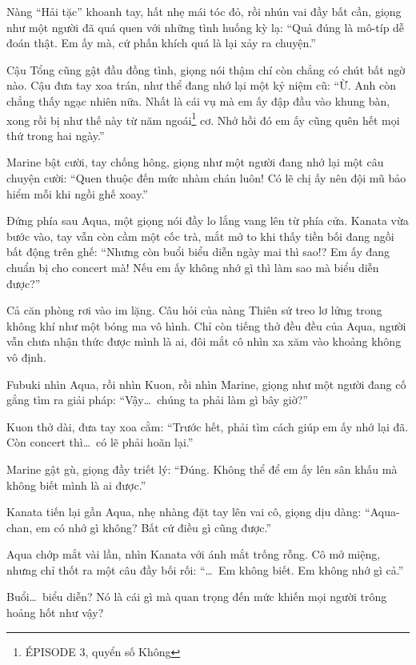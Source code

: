 \documentclass[../main.tex]{subfiles}
\begin{document}
Nàng ``Hải tặc'' khoanh tay, hất nhẹ mái tóc đỏ, rồi nhún vai đầy bất cần, giọng như một người đã quá quen với những tình huống kỳ lạ: ``Quả đúng là mô-típ dễ đoán thật. Em ấy mà, cứ phấn khích quá là lại xảy ra chuyện.''

Cậu Tổng cũng gật đầu đồng tình, giọng nói thậm chí còn chẳng có chút bất ngờ nào. Cậu đưa tay xoa trán, như thể đang nhớ lại một kỷ niệm cũ: ``Ừ. Anh còn chẳng thấy ngạc nhiên nữa. Nhất là cái vụ mà em ấy đập đầu vào khung bàn, xong rồi bị như thế này từ năm ngoái\footnote{{\flaregothic ÉPISODE 3}, quyển số Không} cơ. Nhớ hồi đó em ấy cũng quên hết mọi thứ trong hai ngày.''

Marine bật cười, tay chống hông, giọng như một người đang nhớ lại một câu chuyện cười: ``Quen thuộc đến mức nhàm chán luôn! Có lẽ chị ấy nên đội mũ bảo hiểm mỗi khi ngồi ghế xoay.''

Đứng phía sau Aqua, một giọng nói đầy lo lắng vang lên từ phía cửa. Kanata vừa bước vào, tay vẫn còn cầm một cốc trà, mắt mở to khi thấy tiền bối đang ngồi bất động trên ghế: ``Nhưng còn buổi biểu diễn ngày mai thì sao!? Em ấy đang chuẩn bị cho concert mà! Nếu em ấy không nhớ gì thì làm sao mà biểu diễn được?''


Cả căn phòng rơi vào im lặng. Câu hỏi của nàng Thiên sứ treo lơ lửng trong không khí như một bóng ma vô hình. Chỉ còn tiếng thở đều đều của Aqua, người vẫn chưa nhận thức được mình là ai, đôi mắt cô nhìn xa xăm vào khoảng không vô định.

Fubuki nhìn Aqua, rồi nhìn Kuon, rồi nhìn Marine, giọng như một người đang cố gắng tìm ra giải pháp: ``Vậy\dots\ chúng ta phải làm gì bây giờ?''

Kuon thở dài, đưa tay xoa cằm: ``Trước hết, phải tìm cách giúp em ấy nhớ lại đã. Còn concert thì\dots\ có lẽ phải hoãn lại.''

Marine gật gù, giọng đầy triết lý: ``Đúng. Không thể để em ấy lên sân khấu mà không biết mình là ai được.''

Kanata tiến lại gần Aqua, nhẹ nhàng đặt tay lên vai cô, giọng dịu dàng: ``Aqua-chan, em có nhớ gì không? Bất cứ điều gì cũng được.''

Aqua chớp mắt vài lần, nhìn Kanata với ánh mắt trống rỗng. Cô mở miệng, nhưng chỉ thốt ra một câu đầy bối rối: ``\dots\ Em không biết. Em không nhớ gì cả.''


Buổi\dots\ biểu diễn? Nó là cái gì mà quan trọng đến mức khiến mọi người trông hoảng hốt như vậy?
\end{document}
